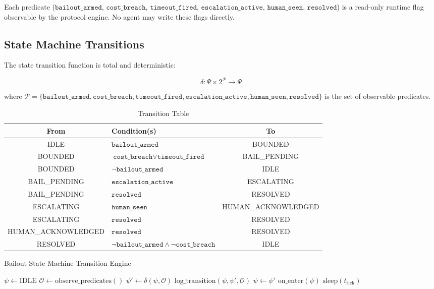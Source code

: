 Each predicate ($\texttt{bailout\_armed}$, $\texttt{cost\_breach}$, $\texttt{timeout\_fired}$, $\texttt{escalation\_active}$, $\texttt{human\_seen}$, $\texttt{resolved}$) is a read-only runtime flag observable by the protocol engine. No agent may write these flags directly.

\bigskip

\subsection{State Machine Transitions}

The state transition function is total and deterministic:

\[
\delta : \Psi \times 2^\mathcal{P} \to \Psi
\]

where $\mathcal{P} = \{\texttt{bailout\_armed}, \texttt{cost\_breach}, \texttt{timeout\_fired}, \texttt{escalation\_active}, \texttt{human\_seen}, \texttt{resolved}\}$ is the set of observable predicates.

\begin{table}[htbp]
\centering
\caption{Transition Table}
\begin{tabular}{cp{2.8cm}c}
\toprule
\textbf{From} & \textbf{Condition(s)} & \textbf{To} \\
\midrule
IDLE & $\texttt{bailout\_armed}$ & BOUNDED \\
BOUNDED & $\texttt{cost\_breach} \lor \texttt{timeout\_fired}$ & BAIL\_PENDING \\
BOUNDED & $\neg \texttt{bailout\_armed}$ & IDLE \\
BAIL\_PENDING & $\texttt{escalation\_active}$ & ESCALATING \\
BAIL\_PENDING & $\texttt{resolved}$ & RESOLVED \\
ESCALATING & $\texttt{human\_seen}$ & HUMAN\_ACKNOWLEDGED \\
ESCALATING & $\texttt{resolved}$ & RESOLVED \\
HUMAN\_ACKNOWLEDGED & $\texttt{resolved}$ & RESOLVED \\
RESOLVED & $\neg \texttt{bailout\_armed} \land \neg \texttt{cost\_breach}$ & IDLE \\
\bottomrule
\end{tabular}
\end{table}

\begin{algorithm}[htbp]
\caption{Bailout State Machine Transition Engine}
\begin{algorithmic}[1]
\State $\psi \leftarrow \text{IDLE}$
\Loop
  \State $\mathcal{O} \leftarrow \text{observe\_predicates}()$
  \State $\psi' \leftarrow \delta(\psi, \mathcal{O})$
    \State $\text{log\_transition}(\psi, \psi', \mathcal{O})$
    \State $\psi \leftarrow \psi'$
    \State $\text{on\_enter}(\psi)$
  \EndIf
  \State $\text{sleep}(t_\text{tick})$
\EndLoop
\end{algorithmic}
\end{algorithm}

